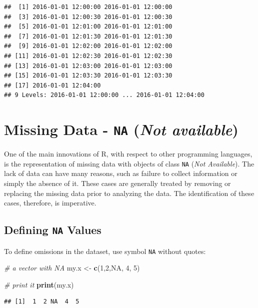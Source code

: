 \documentclass[11pt,]{book}
\newenvironment{Shaded}{\begin{snugshade}}{\end{snugshade}}
\newcommand{\KeywordTok}[1]{\textcolor[rgb]{0.27,0.27,0.27}{\textbf{#1}}}
\newcommand{\DecValTok}[1]{\textcolor[rgb]{0.06,0.06,0.06}{#1}}
\newcommand{\StringTok}[1]{\textcolor[rgb]{0.5,0.5,0.5}{#1}}
\newcommand{\CommentTok}[1]{\textcolor[rgb]{0.56,0.35,0.01}{\textit{#1}}}
\newcommand{\OtherTok}[1]{\textcolor[rgb]{0.56,0.35,0.01}{#1}}
\newcommand{\NormalTok}[1]{#1}
\begin{document}
\begin{verbatim}
##  [1] 2016-01-01 12:00:00 2016-01-01 12:00:00
##  [3] 2016-01-01 12:00:30 2016-01-01 12:00:30
##  [5] 2016-01-01 12:01:00 2016-01-01 12:01:00
##  [7] 2016-01-01 12:01:30 2016-01-01 12:01:30
##  [9] 2016-01-01 12:02:00 2016-01-01 12:02:00
## [11] 2016-01-01 12:02:30 2016-01-01 12:02:30
## [13] 2016-01-01 12:03:00 2016-01-01 12:03:00
## [15] 2016-01-01 12:03:30 2016-01-01 12:03:30
## [17] 2016-01-01 12:04:00
## 9 Levels: 2016-01-01 12:00:00 ... 2016-01-01 12:04:00
\end{verbatim}

\section{\texorpdfstring{Missing Data - \texttt{NA} (\emph{Not
available})}{Missing Data - NA (Not available)}}\label{missing-data---na-not-available}

One of the main innovations of R, with respect to other programming
languages, is the representation of missing data with objects of class
\texttt{NA} (\emph{Not Available}). The lack of data can have many
reasons, such as failure to collect information or simply the absence of
it. These cases are generally treated by removing or replacing the
missing data prior to analyzing the data. The identification of these
cases, therefore, is imperative. 

\subsection{\texorpdfstring{Defining \texttt{NA}
Values}{Defining NA Values}}\label{defining-na-values}

To define omissions in the dataset, use symbol \texttt{NA} without
quotes:

\begin{Shaded}
\begin{Highlighting}[]
\CommentTok{# a vector with NA}
\NormalTok{my.x <-}\StringTok{ }\KeywordTok{c}\NormalTok{(}\DecValTok{1}\NormalTok{,}\DecValTok{2}\NormalTok{,}\OtherTok{NA}\NormalTok{, }\DecValTok{4}\NormalTok{, }\DecValTok{5}\NormalTok{)}

\CommentTok{# print it}
\KeywordTok{print}\NormalTok{(my.x)}
\end{Highlighting}
\end{Shaded}

\begin{verbatim}
## [1]  1  2 NA  4  5
\end{verbatim}
\end{document}
